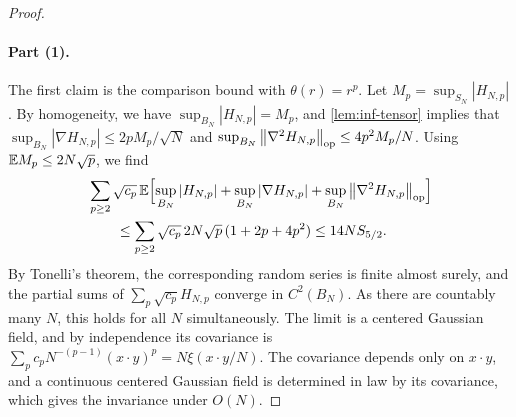 \begin{proof}
\paragraph{Part (1).} The first claim is the comparison bound with $\theta(r)=r^p$. Let $M_p=\sup_{S_N}|H_{N,p}|$. By homogeneity, we have $\sup_{B_N}|H_{N,p}|=M_p$, and \cref{lem:inf-tensor} implies that $\sup_{B_N}|\nabla H_{N,p}|\le2pM_p/\sqrt N$ and $\sup_{B_N}\left\lVert\nabla^2H_{N,p}\right\rVert_{\mathrm{op}}\le4p^2M_p/N$. Using $\mathbb E M_p\le2N\sqrt p$, we find
\begin{equation*}
\begin{split}
&\sum_{p\ge2}\sqrt{c_p}\,\mathbb E\Bigl[\sup_{B_N}|H_{N,p}|+\sup_{B_N}|\nabla H_{N,p}|+\sup_{B_N}\left\lVert\nabla^2H_{N,p}\right\rVert_{\mathrm{op}}\Bigr]\\
&\qquad\le\sum_{p\ge2}\sqrt{c_p}\,2N\sqrt p\,(1+2p+4p^2)\le14NS_{5/2}.
\end{split}
\end{equation*}
By Tonelli's theorem, the corresponding random series is finite almost surely, and the partial sums of $\sum_p\sqrt{c_p}H_{N,p}$ converge in $C^2(B_N)$. As there are countably many $N$, this holds for all $N$ simultaneously. The limit is a centered Gaussian field, and by independence its covariance is $\sum_pc_pN^{-(p-1)}(x\cdot y)^p=N\xi(x\cdot y/N)$. The covariance depends only on $x\cdot y$, and a continuous centered Gaussian field is determined in law by its covariance, which gives the invariance under $O(N)$.


\end{proof}
